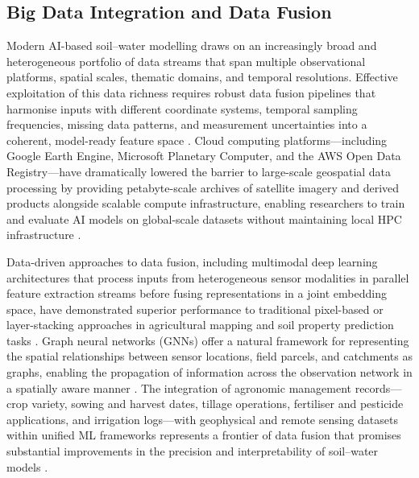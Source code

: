 \documentclass[land,article,submit,pdftex,moreauthors]{Definitions/mdpi}
\numberwithin{equation}{section}
\begin{document}
\subsection{Big Data Integration and Data Fusion}

Modern AI-based soil--water modelling draws on an increasingly broad and heterogeneous portfolio of data streams that span multiple observational platforms, spatial scales, thematic domains, and temporal resolutions. Effective exploitation of this data richness requires robust data fusion pipelines that harmonise inputs with different coordinate systems, temporal sampling frequencies, missing data patterns, and measurement uncertainties into a coherent, model-ready feature space \citep{reichstein2019deep}. Cloud computing platforms---including Google Earth Engine, Microsoft Planetary Computer, and the AWS Open Data Registry---have dramatically lowered the barrier to large-scale geospatial data processing by providing petabyte-scale archives of satellite imagery and derived products alongside scalable compute infrastructure, enabling researchers to train and evaluate AI models on global-scale datasets without maintaining local HPC infrastructure \citep{gorelick2017google}.

Data-driven approaches to data fusion, including multimodal deep learning architectures that process inputs from heterogeneous sensor modalities in parallel feature extraction streams before fusing representations in a joint embedding space, have demonstrated superior performance to traditional pixel-based or layer-stacking approaches in agricultural mapping and soil property prediction tasks \citep{hong2021multimodal}. Graph neural networks (GNNs) offer a natural framework for representing the spatial relationships between sensor locations, field parcels, and catchments as graphs, enabling the propagation of information across the observation network in a spatially aware manner \citep{xu2021graph}. The integration of agronomic management records---crop variety, sowing and harvest dates, tillage operations, fertiliser and pesticide applications, and irrigation logs---with geophysical and remote sensing datasets within unified ML frameworks represents a frontier of data fusion that promises substantial improvements in the precision and interpretability of soil--water models \citep{liakos2018machine}.

\end{document}
